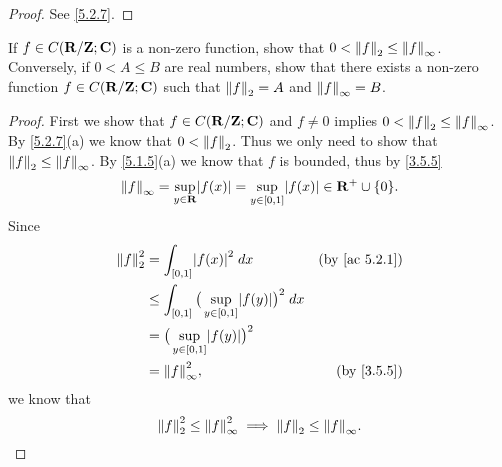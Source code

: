 \begin{proof}
  See \cref{5.2.7}.
\end{proof}

\begin{exercise}\label{ex 5.2.3}
  If \(f \in C(\R / \Z ; \C)\) is a non-zero function, show that \(0 < \norm*{f}_2 \leq \norm*{f}_\infty\).
  Conversely, if \(0 < A \leq B\) are real numbers, show that there exists a non-zero function \(f \in C(\R / \Z ; \C)\) such that \(\norm*{f}_2 = A\) and \(\norm*{f}_\infty = B\).
\end{exercise}

\begin{proof}
  First we show that \(f \in C(\R / \Z ; \C)\) and \(f \neq 0\) implies \(0 < \norm*{f}_2 \leq \norm*{f}_{\infty}\).
  By \cref{5.2.7}(a) we know that \(0 < \norm*{f}_2\).
  Thus we only need to show that \(\norm*{f}_2 \leq \norm*{f}_\infty\).
  By \cref{5.1.5}(a) we know that \(f\) is bounded, thus by \cref{3.5.5}
  \[
    \norm*{f}_{\infty} = \sup_{y \in \R} \abs{f(x)} = \sup_{y \in [0, 1]} \abs{f(x)} \in \R^+ \cup \{0\}.
  \]
  Since
  \begin{align*}
    \norm*{f}_2^2 & = \int_{[0, 1]} \abs{f(x)}^2 \; dx                                  & \text{(by \cref{ac 5.2.1})} \\
                  & \leq \int_{[0, 1]} \big(\sup_{y \in [0, 1]} \abs{f(y)}\big)^2 \; dx                               \\
                  & = \big(\sup_{y \in [0, 1]} \abs{f(y)}\big)^2                                                      \\
                  & = \norm*{f}_{\infty}^2,                                             & \text{(by \cref{3.5.5})}
  \end{align*}
  we know that
  \[
    \norm*{f}_2^2 \leq \norm*{f}_{\infty}^2 \implies \norm*{f}_2 \leq \norm*{f}_{\infty}.
  \]


\end{proof}
